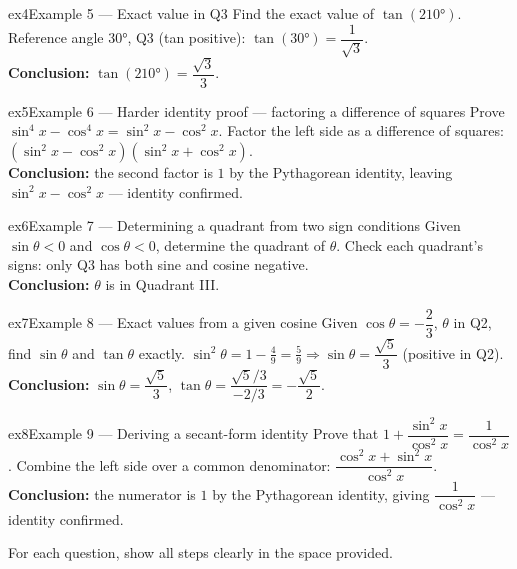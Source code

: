 \documentclass[11pt]{article}
\begin{document}
\begin{example}{ex4}{Example 5 --- Exact value in Q3}
Find the exact value of $\tan(210°)$.\soln
Reference angle $30°$, Q3 (tan positive): $\tan(30°)=\dfrac{1}{\sqrt3}$.\\[3pt]\textbf{Conclusion:} $\tan(210°)=\dfrac{\sqrt3}{3}$.
\end{example}

\begin{example}{ex5}{Example 6 --- Harder identity proof --- factoring a difference of squares}
Prove $\sin^4x-\cos^4x=\sin^2x-\cos^2x$.\soln
Factor the left side as a difference of squares: $(\sin^2x-\cos^2x)(\sin^2x+\cos^2x)$.\\[3pt]\textbf{Conclusion:} the second factor is $1$ by the Pythagorean identity, leaving $\sin^2x-\cos^2x$ --- identity confirmed.
\end{example}

\begin{example}{ex6}{Example 7 --- Determining a quadrant from two sign conditions}
Given $\sin\theta<0$ and $\cos\theta<0$, determine the quadrant of $\theta$.\soln
Check each quadrant's signs: only Q3 has both sine and cosine negative.\\[3pt]\textbf{Conclusion:} $\theta$ is in Quadrant III.
\end{example}

\begin{example}{ex7}{Example 8 --- Exact values from a given cosine}
Given $\cos\theta=-\dfrac23$, $\theta$ in Q2, find $\sin\theta$ and $\tan\theta$ exactly.\soln
$\sin^2\theta=1-\tfrac49=\tfrac59\Rightarrow\sin\theta=\dfrac{\sqrt5}3$ (positive in Q2).\\[3pt]\textbf{Conclusion:} $\sin\theta=\dfrac{\sqrt5}3$, $\tan\theta=\dfrac{\sqrt5/3}{-2/3}=-\dfrac{\sqrt5}2$.
\end{example}

\begin{example}{ex8}{Example 9 --- Deriving a secant-form identity}
Prove that $1+\dfrac{\sin^2x}{\cos^2x}=\dfrac{1}{\cos^2x}$.\soln
Combine the left side over a common denominator: $\dfrac{\cos^2x+\sin^2x}{\cos^2x}$.\\[3pt]\textbf{Conclusion:} the numerator is $1$ by the Pythagorean identity, giving $\dfrac{1}{\cos^2x}$ --- identity confirmed.
\end{example}

\clearpage
{}
For each question, show all steps clearly in the space provided.
\end{document}
